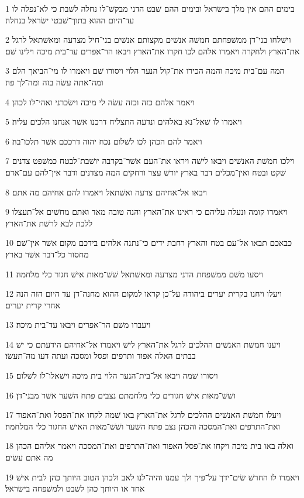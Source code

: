 \par 1 בימים ההם אין מלך בישׂראל ובימים ההם שׁבט הדני מבקשׁ־לו נחלה לשׁבת כי לא־נפלה לו עד־היום ההוא בתוך־שׁבטי ישׂראל בנחלה׃
\par 2 וישׁלחו בני־דן ממשׁפחתם חמשׁה אנשׁים מקצותם אנשׁים בני־חיל מצרעה ומאשׁתאל לרגל את־הארץ ולחקרה ויאמרו אלהם לכו חקרו את־הארץ ויבאו הר־אפרים עד־בית מיכה וילינו שׁם׃
\par 3 המה עם־בית מיכה והמה הכירו את־קול הנער הלוי ויסורו שׁם ויאמרו לו מי־הביאך הלם ומה־אתה עשׂה בזה ומה־לך פה׃
\par 4 ויאמר אלהם כזה וכזה עשׂה לי מיכה וישׂכרני ואהי־לו לכהן׃
\par 5 ויאמרו לו שׁאל־נא באלהים ונדעה התצליח דרכנו אשׁר אנחנו הלכים עליה׃
\par 6 ויאמר להם הכהן לכו לשׁלום נכח יהוה דרככם אשׁר תלכו־בה׃
\par 7 וילכו חמשׁת האנשׁים ויבאו לישׁה ויראו את־העם אשׁר־בקרבה יושׁבת־לבטח כמשׁפט צדנים שׁקט ובטח ואין־מכלים דבר בארץ יורשׁ עצר ורחקים המה מצדנים ודבר אין־להם עם־אדם׃
\par 8 ויבאו אל־אחיהם צרעה ואשׁתאל ויאמרו להם אחיהם מה אתם׃
\par 9 ויאמרו קומה ונעלה עליהם כי ראינו את־הארץ והנה טובה מאד ואתם מחשׁים אל־תעצלו ללכת לבא לרשׁת את־הארץ׃
\par 10 כבאכם תבאו אל־עם בטח והארץ רחבת ידים כי־נתנה אלהים בידכם מקום אשׁר אין־שׁם מחסור כל־דבר אשׁר בארץ׃
\par 11 ויסעו משׁם ממשׁפחת הדני מצרעה ומאשׁתאל שׁשׁ־מאות אישׁ חגור כלי מלחמה׃
\par 12 ויעלו ויחנו בקרית יערים ביהודה על־כן קראו למקום ההוא מחנה־דן עד היום הזה הנה אחרי קרית יערים׃
\par 13 ויעברו משׁם הר־אפרים ויבאו עד־בית מיכה׃
\par 14 ויענו חמשׁת האנשׁים ההלכים לרגל את־הארץ לישׁ ויאמרו אל־אחיהם הידעתם כי ישׁ בבתים האלה אפוד ותרפים ופסל ומסכה ועתה דעו מה־תעשׂו׃
\par 15 ויסורו שׁמה ויבאו אל־בית־הנער הלוי בית מיכה וישׁאלו־לו לשׁלום׃
\par 16 ושׁשׁ־מאות אישׁ חגורים כלי מלחמתם נצבים פתח השׁער אשׁר מבני־דן׃
\par 17 ויעלו חמשׁת האנשׁים ההלכים לרגל את־הארץ באו שׁמה לקחו את־הפסל ואת־האפוד ואת־התרפים ואת־המסכה והכהן נצב פתח השׁער ושׁשׁ־מאות האישׁ החגור כלי המלחמה׃
\par 18 ואלה באו בית מיכה ויקחו את־פסל האפוד ואת־התרפים ואת־המסכה ויאמר אליהם הכהן מה אתם עשׂים׃
\par 19 ויאמרו לו החרשׁ שׂים־ידך על־פיך ולך עמנו והיה־לנו לאב ולכהן הטוב היותך כהן לבית אישׁ אחד או היותך כהן לשׁבט ולמשׁפחה בישׂראל׃
